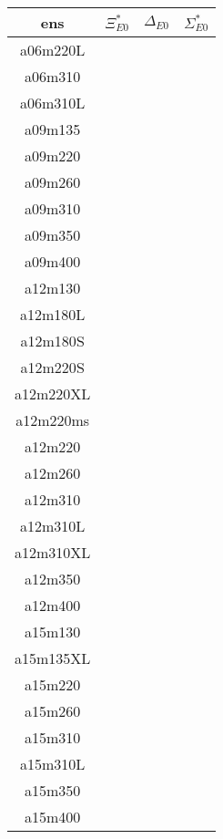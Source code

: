\documentclass{article}
\begin{document}
\newpage 
\begin{table}[h!]
 \centering
 \setlength{\arrayrulewidth}{0.5mm}
\setlength{\tabcolsep}{13pt}
\renewcommand{\arraystretch}{1}
 \begin{tabular}{|| c | c | c |c ||} 
 \hline
 ens & $\Xi^*_{E0}$ & $\Delta_{E0}$ & $\Sigma^*_{E0}$ \\ [0.8ex] 
 \hline\hline
 a06m220L
  &   &   &  &     \\
 \hline
 a06m310
 &  & & &     \\
 \hline
 a06m310L
  &  & & &     \\
 \hline
 a09m135
  &  & & &     \\
 \hline
 a09m220
  &  & & &     \\
 \hline
 a09m260
  &  & & &     \\
 \hline
 a09m310
  &  & & &     \\
 \hline
 a09m350
  &  & & &     \\
 \hline
 a09m400
  &  & & &     \\
 \hline
 a12m130
  &  & & &     \\
 \hline
 a12m180L
  &  & & &     \\
 \hline
 a12m180S
 &  & & &     \\
 \hline
 a12m220S
  &  & & &     \\
 \hline
 a12m220XL
 &  & & &     \\
 \hline
 a12m220ms
  &  & & &     \\
 \hline
 a12m220
  &  & & &     \\
 \hline
 a12m260
  &  & & &     \\
 \hline
 a12m310
  &  & & &     \\
 \hline
 a12m310L
  &  & & &     \\
 \hline
 a12m310XL
 &  & & &     \\
 \hline
 a12m350
  &  & & &     \\
 \hline
 a12m400
  &  & & &     \\
 \hline
 a15m130
  &  & & &     \\
 \hline
 a15m135XL
  &  & & &     \\
 \hline
 a15m220
  &  & & &     \\
 \hline
 a15m260
  &  & & &     \\
 \hline
 a15m310
  &  & & &     \\
 \hline
 a15m310L
  &  & & &     \\
 \hline
 a15m350
  &  & & &     \\
 \hline
 a15m400
  &  & & &     \\
 \hline
 \end{tabular}
\end{table}
\end{document}
